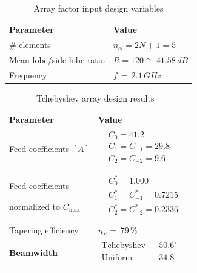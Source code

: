 \documentclass[10 pt,a4paper,twocolumn]{article}
\begin{document}
{\begin{table}[b!]
	\begin{center}
		{
		\selectfont	\begin{tabular}{||m{4cm}|m{4cm}||}
				\hline
				\cellcolor{deepsaffron}\textbf{Parameter} & \cellcolor{deepsaffron}\textbf{Value}\\
				\hline
				\# elements & $n_{el}=2N+1=5$\\
				\hline
				Mean lobe/side lobe
				ratio  & $R = 120 \cong\, 41.58\,dB$\\
				\hline 
				Frequency & $f\,=\,2.1\,GHz$\\
				\hline
		\end{tabular}}
		\caption{Array factor input design variables}
		\label{table:input_design_cheb}
	\end{center}
\end{table}
\begin{table}[b!] 
	\begin{center}
		{\selectfont
			\begin{tabular}{||m{4cm}|m{4cm}||}
				\hline
				\cellcolor{deepsaffron}\textbf{Parameter}
				& \cellcolor{deepsaffron}\textbf{Value} 
				\\
				\hline
				{Feed coefficients} $[A]$ &  \footnotesize{$\begin{aligned}
						&C_0 = 	41.2						\\
						&C_1=C_{-1} = 29.8 \\
						&C_{2}=C_{-2} = 9.6 \\
					\end{aligned}$}\\
				\hline 
				{Feed coefficients 
					
					normalized to $C_{\max}$} &  
				\footnotesize{$\begin{aligned}
						&C_0^* = 	1.000						\\
						& C_1^*=C_{-1}^* = 0.7215 \\
						& C_{2}^*=C_{-2}^*  =0.2336 \\
					\end{aligned}$} \\
				\hline
				{Tapering efficiency} & \footnotesize{$\eta_T\,=\,79\,\%$}\\ 
				\hline 
				\textbf{Beamwidth} & $ \begin{matrix}
					\text{Tchebyshev} & &50.6^\circ \\
					
					\text{Uniform} &  & 34.8^\circ\\
				\end{matrix} $ \\
				\hline 
		\end{tabular}}
		\caption{Tchebyshev array design results}
		\label{table:tcheby results}
	\end{center}
\end{table}
\indent 

}
\end{document}
